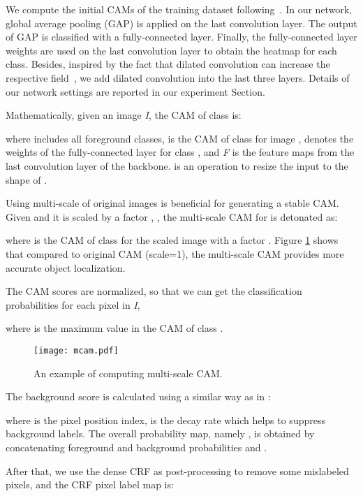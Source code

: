 \documentclass[letterpaper]{article} \usepackage{aaai20}  \usepackage{times}  \usepackage{helvet} \usepackage{courier}  \usepackage[hyphens]{url}  \usepackage{graphicx} \urlstyle{rm} \def\UrlFont{\rm}  \usepackage{graphicx}  \frenchspacing  \setlength{\pdfpagewidth}{8.5in}  \setlength{\pdfpageheight}{11in}
\begin{document}
We compute the initial CAMs of the training dataset following~\cite{zhou2016learning}. In our network, global average pooling (GAP) is applied on the last convolution layer. The output of GAP is classified with a fully-connected layer. Finally, the fully-connected layer weights are used on the last convolution layer to obtain the heatmap for each class. Besides, inspired by the fact that dilated convolution can increase the respective field~\cite{wei2018revisiting}, we add dilated convolution into the last three layers. Details of our network settings are reported in our experiment Section.

Mathematically, given an image \emph{I}, the CAM of class  is:

where  includes all foreground classes,  is the CAM of class  for image ,   denotes the weights of the fully-connected layer for class , and \emph{F} is the feature maps from the last convolution layer of the backbone.  is an operation to resize the input to the shape of . 

Using multi-scale of original images is beneficial for generating a stable CAM. Given  and it is scaled by a factor , , the multi-scale CAM for  is detonated as:
  
where  is the CAM of class  for the scaled image  with a factor . Figure \ref{mcam} shows that compared to original CAM (scale=1), the multi-scale CAM provides more accurate object localization.

The CAM scores are normalized, so that we can get the classification probabilities for each pixel in \emph{I},

where  is the maximum value in the CAM of class . 

\begin{figure}[!htb]
	\centering
	\texttt{[image: mcam.pdf]}
	\caption{An example of computing multi-scale CAM.}
	\label{mcam}
\end{figure}

The background score is calculated using a similar way as in  \cite{ahn2018learning}:

where  is the pixel position index,  is the decay rate which helps to suppress background labels. The overall probability map, namely , is obtained by concatenating foreground and background probabilities  and .

After that, we use the dense CRF \cite{krahenbuhl2013parameter} as post-processing to remove some mislabeled pixels, and the CRF pixel label map is:
\end{document}
